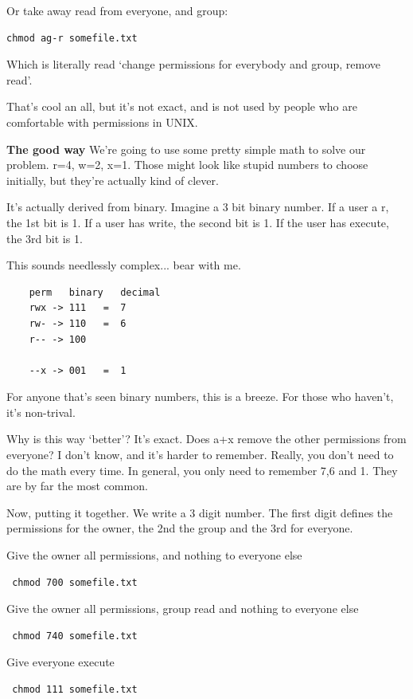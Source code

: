 	Or take away read from everyone, and group:
	\begin{verbatim}chmod ag-r somefile.txt \end{verbatim}
	Which is literally read `change permissions for everybody and group, remove read'.
		
	That's cool an all, but it's not exact, and is not used by people who are comfortable with permissions in UNIX.
	
	\textbf{The good way}
	We're going to use some pretty simple math to solve our problem. r=4, w=2, x=1. Those might look like 
	stupid numbers to choose initially, but they're actually kind of clever.
	
	It's actually derived from binary. Imagine a 3 bit binary number. If a user a r, the 1st bit is 1.
	If a user has write, the second bit is 1. If the user has execute, the 3rd bit is 1.
	
	This sounds needlessly complex... bear with me.
	
\begin{verbatim}
	perm   binary   decimal
	rwx -> 111   =  7
	rw- -> 110   =  6
	r-- -> 100
	
	--x -> 001   =  1
\end{verbatim}
For anyone that's seen binary numbers, this is a breeze. For those who haven't, it's non-trival.

Why is this way `better'? It's exact. Does a+x remove the other permissions from everyone? I don't know,
and it's harder to remember. Really, you don't need to do the math every time. In general, you only 
need to remember 7,6 and 1. They are by far the most common.

Now, putting it together. We write a 3 digit number. The first digit defines the 
permissions for the owner, the 2nd the group and the 3rd for everyone.

Give the owner all permissions, and nothing to everyone else
\begin{verbatim} chmod 700 somefile.txt \end{verbatim}
	

Give the owner all permissions, group read and nothing to everyone else
\begin{verbatim} chmod 740 somefile.txt \end{verbatim}	

Give everyone execute
\begin{verbatim} chmod 111 somefile.txt \end{verbatim}	


